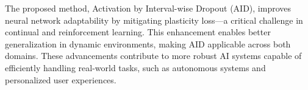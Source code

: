 

The proposed method, Activation by Interval-wise Dropout (AID), improves neural network adaptability by mitigating plasticity loss—a critical challenge in continual and reinforcement learning. This enhancement enables better generalization in dynamic environments, making AID applicable across both domains. These advancements contribute to more robust AI systems capable of efficiently handling real-world tasks, such as autonomous systems and personalized user experiences.

